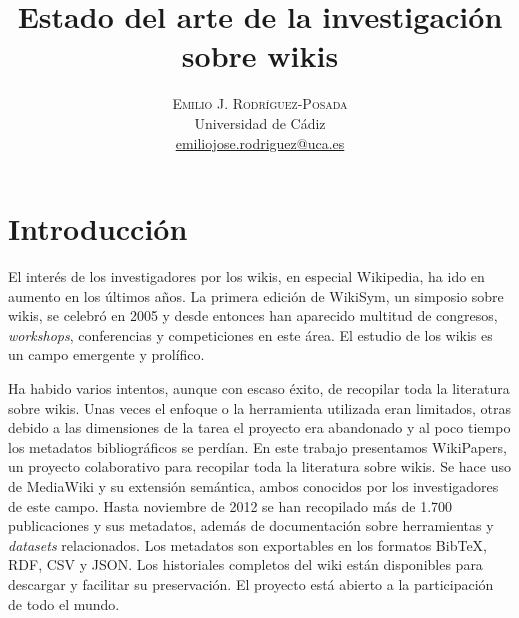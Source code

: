 \documentclass[11pt,onecolumn]{article}
\title{\vspace{-15mm}%
	\fontsize{24pt}{10pt}\selectfont
	\textbf{Estado del arte de la investigación sobre wikis}
	}
\author{%
	\large
	\textsc{Emilio J. Rodríguez-Posada} \\
	\normalsize	Universidad de Cádiz \\
	\normalsize	\href{mailto:emiliojose.rodriguez@uca.es}{emiliojose.rodriguez@uca.es}
	\vspace{-5mm}
	}
\date{}
\begin{document}
\maketitle

\begin{abstract}

\end{abstract}

\section{Introducción}





El interés de los investigadores por los wikis, en especial Wikipedia, ha ido en aumento en los últimos años. La primera edición de WikiSym, un simposio sobre wikis, se celebró en 2005 y desde entonces han aparecido multitud de congresos, \emph{workshops}, conferencias y competiciones en este área. El estudio de los wikis es un campo emergente y prolífico.

Ha habido varios intentos, aunque con escaso éxito, de recopilar toda la literatura sobre wikis. Unas veces el enfoque o la herramienta utilizada eran limitados, otras debido a las dimensiones de la tarea el proyecto era abandonado y al poco tiempo los metadatos bibliográficos se perdían. En este trabajo presentamos WikiPapers, un proyecto colaborativo para recopilar toda la literatura sobre wikis. Se hace uso de MediaWiki y su extensión semántica, ambos conocidos por los investigadores de este campo. Hasta noviembre de 2012 se han recopilado más de 1.700 publicaciones y sus metadatos, además de documentación sobre herramientas y \emph{datasets} relacionados. Los metadatos son exportables en los formatos BibTeX, RDF, CSV y JSON. Los historiales completos del wiki están disponibles para descargar y facilitar su preservación. El proyecto está abierto a la participación de todo el mundo.
\end{document}
